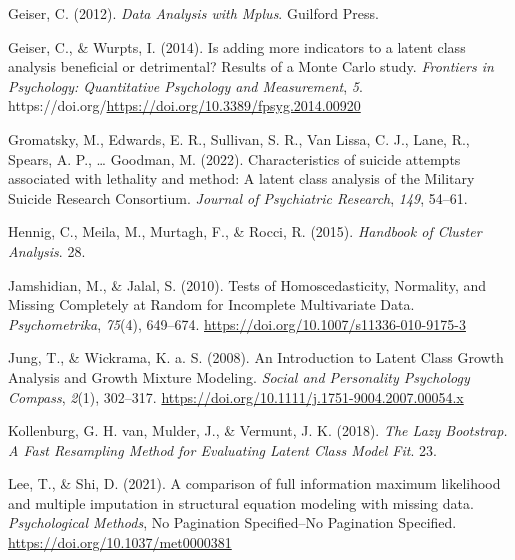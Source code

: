 \documentclass[
  ,man,floatsintext]{apa6}
\newlength{\cslhangindent}
\newlength{\cslentryspacingunit} %
\newenvironment{CSLReferences}[2] %
 {%
  \setlength{\parindent}{0pt}
  \ifodd #1
  \let\oldpar\par
  \def\par{\hangindent=\cslhangindent\oldpar}
  \fi
  \setlength{\parskip}{#2\cslentryspacingunit}
 }%
 {}
\begin{document}
\begin{CSLReferences}{1}{0}
\leavevmode{}%
Geiser, C. (2012). \emph{Data {Analysis} with {Mplus}}. Guilford Press.

\leavevmode{}%
Geiser, C., \& Wurpts, I. (2014). Is adding more indicators to a latent class analysis beneficial or detrimental? {Results} of a {Monte} {Carlo} study. \emph{Frontiers in Psychology: Quantitative Psychology and Measurement}, \emph{5}. https://doi.org/\url{https://doi.org/10.3389/fpsyg.2014.00920}

\leavevmode{}%
Gromatsky, M., Edwards, E. R., Sullivan, S. R., Van Lissa, C. J., Lane, R., Spears, A. P., \ldots{} Goodman, M. (2022). Characteristics of suicide attempts associated with lethality and method: {A} latent class analysis of the {Military} {Suicide} {Research} {Consortium}. \emph{Journal of Psychiatric Research}, \emph{149}, 54--61.

\leavevmode{}%
Hennig, C., Meila, M., Murtagh, F., \& Rocci, R. (2015). \emph{Handbook of {Cluster} {Analysis}}. 28.

\leavevmode{}%
Jamshidian, M., \& Jalal, S. (2010). Tests of {Homoscedasticity}, {Normality}, and {Missing} {Completely} at {Random} for {Incomplete} {Multivariate} {Data}. \emph{Psychometrika}, \emph{75}(4), 649--674. \url{https://doi.org/10.1007/s11336-010-9175-3}

\leavevmode{}%
Jung, T., \& Wickrama, K. a. S. (2008). An {Introduction} to {Latent} {Class} {Growth} {Analysis} and {Growth} {Mixture} {Modeling}. \emph{Social and Personality Psychology Compass}, \emph{2}(1), 302--317. \url{https://doi.org/10.1111/j.1751-9004.2007.00054.x}

\leavevmode{}%
Kollenburg, G. H. van, Mulder, J., \& Vermunt, J. K. (2018). \emph{The {Lazy} {Bootstrap}. {A} {Fast} {Resampling} {Method} for {Evaluating} {Latent} {Class} {Model} {Fit}}. 23.

\leavevmode{}%
Lee, T., \& Shi, D. (2021). A comparison of full information maximum likelihood and multiple imputation in structural equation modeling with missing data. \emph{Psychological Methods}, No Pagination Specified--No Pagination Specified. \url{https://doi.org/10.1037/met0000381}


\end{CSLReferences}
\end{document}
